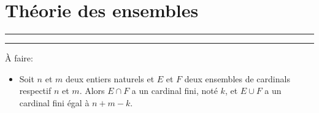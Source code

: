 \section{Théorie des ensembles}















\bigskip

\hrule
\hrule

\medskip

\noindent À faire:
\begin{itemize}
    \item Soit $n$ et $m$ deux entiers naturels et $E$ et $F$ deux ensembles de cardinals respectif $n$ et $m$. Alors $E \cap F$ a un cardinal fini, noté $k$, et $E \cup F$ a un cardinal fini égal à $n+m-k$.
\end{itemize}
